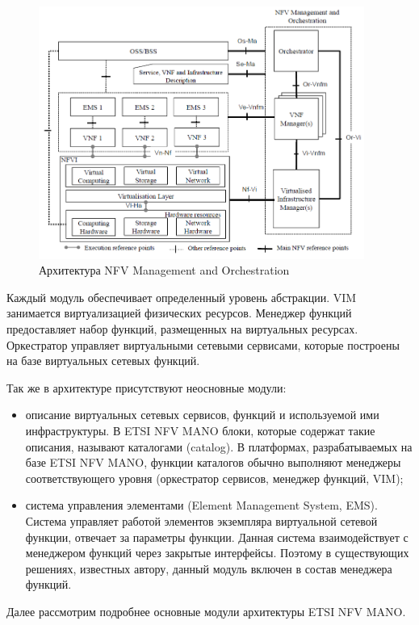 \documentclass[oneside,final,14pt,a4paper]{extreport}
\begin{document}
\begin{figure}[h]
	\centering
	\includegraphics[width=0.95\textwidth]{nfv-mano}
	\caption{Архитектура NFV Management and Orchestration}
	\label{nfv-mano-image1}
\end{figure}

Каждый модуль обеспечивает определенный уровень абстракции. VIM занимается виртуализацией физических ресурсов. Менеджер функций предоставляет набор функций, размещенных на виртуальных ресурсах. Оркестратор управляет виртуальными сетевыми сервисами, которые построены на базе виртуальных сетевых функций.

Так же в архитектуре присутствуют неосновные модули:
\begin{itemize}
	\item описание виртуальных сетевых сервисов, функций и используемой ими инфраструктуры. В ETSI NFV MANO блоки, которые содержат такие описания, называют каталогами (catalog). В платформах, разрабатываемых на базе ETSI NFV MANO, функции каталогов обычно выполняют менеджеры соответствующего уровня (оркестратор сервисов, менеджер функций, VIM);
	\item система управления элементами (Element Management System, EMS). Система управляет работой элементов экземпляра виртуальной сетевой функции, отвечает за параметры функции. Данная система взаимодействует с менеджером функций через закрытые интерфейсы. Поэтому в существующих решениях, известных автору, данный модуль включен в состав менеджера функций.
\end{itemize}

Далее рассмотрим подробнее основные модули архитектуры ETSI NFV MANO.
\end{document}
